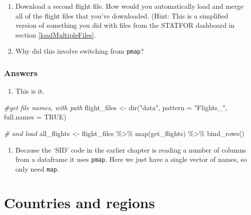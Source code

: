 \documentclass[
]{book}
\newenvironment{Shaded}{\begin{snugshade}}{\end{snugshade}}
\newcommand{\AttributeTok}[1]{\textcolor[rgb]{0.77,0.63,0.00}{#1}}
\newcommand{\CommentTok}[1]{\textcolor[rgb]{0.56,0.35,0.01}{\textit{#1}}}
\newcommand{\ConstantTok}[1]{\textcolor[rgb]{0.00,0.00,0.00}{#1}}
\newcommand{\FunctionTok}[1]{\textcolor[rgb]{0.00,0.00,0.00}{#1}}
\newcommand{\NormalTok}[1]{#1}
\newcommand{\OtherTok}[1]{\textcolor[rgb]{0.56,0.35,0.01}{#1}}
\newcommand{\SpecialCharTok}[1]{\textcolor[rgb]{0.00,0.00,0.00}{#1}}
\newcommand{\StringTok}[1]{\textcolor[rgb]{0.31,0.60,0.02}{#1}}
\providecommand{\tightlist}{%
  \setlength{\itemsep}{0pt}\setlength{\parskip}{0pt}}
\begin{document}
\begin{enumerate}
\def\labelenumi{\arabic{enumi})}
\tightlist
\item
  Download a second flight file. How would you automatically load and merge all of the flight files that you've downloaded. (Hint: This is a simplified version of something you did with files from the STATFOR dashboard in section \ref{loadMultipleFiles}.
\item
  Why did this involve switching from \texttt{pmap}?
\end{enumerate}

\hypertarget{answers-9}{%
\subsubsection{Answers}\label{answers-9}}

\begin{enumerate}
\def\labelenumi{\arabic{enumi})}
\tightlist
\item
  This is it.
\end{enumerate}

\begin{Shaded}
\begin{Highlighting}[]
\CommentTok{\#get file names, with path}
\NormalTok{flight\_files }\OtherTok{\textless{}{-}} \FunctionTok{dir}\NormalTok{(}\StringTok{"data"}\NormalTok{, }\AttributeTok{pattern =} \StringTok{"Flights\_"}\NormalTok{, }\AttributeTok{full.names =} \ConstantTok{TRUE}\NormalTok{)}

\CommentTok{\# and load}
\NormalTok{all\_flights }\OtherTok{\textless{}{-}}\NormalTok{ flight\_files }\SpecialCharTok{\%\textgreater{}\%} 
  \FunctionTok{map}\NormalTok{(get\_flights) }\SpecialCharTok{\%\textgreater{}\%} 
  \FunctionTok{bind\_rows}\NormalTok{()}
\end{Highlighting}
\end{Shaded}

\begin{enumerate}
\def\labelenumi{\arabic{enumi})}
\setcounter{enumi}{1}
\tightlist
\item
  Because the `SID' code in the earlier chapter is reading a number of columns from a dataframe it uses \texttt{pmap}. Here we just have a single vector of names, so only need \texttt{map}.
\end{enumerate}

\hypertarget{mapRegions}{%
\section{Countries and regions}\label{mapRegions}}
\end{document}
